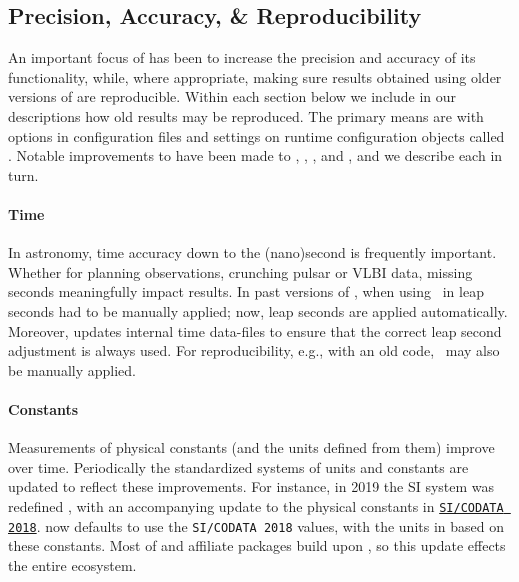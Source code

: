 \documentclass[modern]{aastex631}
\begin{document}
\subsection{Precision, Accuracy, \& Reproducibility}
\label{sec:core-features-precision_accuracy_repreducibility}

An important focus of \astropy has been to increase the precision and accuracy
of its functionality, while, where appropriate, making sure results obtained
using older versions of \astropypkg are reproducible. Within each section below
we include in our descriptions how old results may be reproduced. The primary
means are with options in configuration files and settings on runtime configuration
objects called \astropyScienceState. Notable improvements to \astropypkg have
been made to \astropytime, \astropyconstants, \astropycoordinates, and
\astropycosmology, and we describe each in turn.

\paragraph{Time}
In astronomy, time accuracy down to the (nano)second is frequently important.
Whether for planning observations, crunching pulsar or VLBI data, missing
seconds meaningfully impact results. In past versions of \astropypkg, when using
\astropyTime\ in \astropytime leap seconds had to be manually applied; now, leap
seconds are applied automatically. Moreover, \astropypkg updates internal time
data-files to ensure that the correct leap second adjustment is always used. For
reproducibility, e.g., with an old code, \astropyLeapSeconds\ may also be
manually applied.

\paragraph{Constants}

Measurements of physical constants (and the units defined from them) improve
over time. Periodically the standardized systems of units and constants are
updated to reflect these improvements. For instance, in 2019 the SI system was
redefined \citep{NIST2019}, with an accompanying update to the physical
constants in
\href{https://codata.org/initiatives/data-science-and-stewardship/fundamental-physical-constants/}{\texttt{SI/CODATA
2018}}. \astropyconstants now defaults to use the \texttt{SI/CODATA 2018}
values, with the units in \astropyunits based on these constants. Most of
\astropypkg and affiliate packages build upon \astropyunits, so this update
effects the entire \astropy ecosystem.
\end{document}
